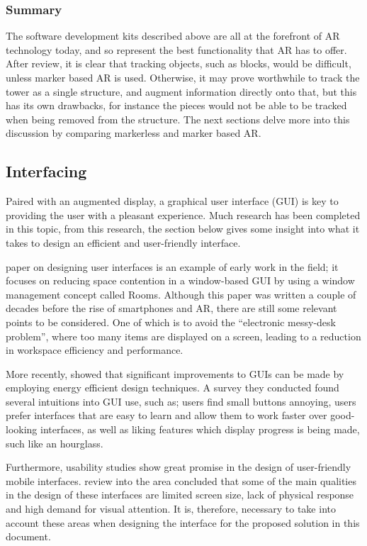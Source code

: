 \subsubsection{Summary}
The software development kits described above are all at the forefront of AR technology today, and so represent the best functionality that AR has to offer. After review, it is clear that tracking objects, such as \jenga{} blocks, would be difficult, unless marker based AR is used. Otherwise, it may prove worthwhile to track the tower as a single structure, and augment information directly onto that, but this has its own drawbacks, for instance the pieces would not be able to be tracked when being removed from the structure. The next sections delve more into this discussion by comparing markerless and marker based AR.

\subsection{Interfacing}

Paired with an augmented display, a graphical user interface (GUI) is key to providing the user with a pleasant experience. Much research has been completed in this topic, from this research, the section below gives some insight into what it takes to design an efficient and user-friendly interface.

 paper on designing user interfaces is an example of early work in the field; it focuses on reducing space contention in a window-based GUI by using a window management concept called Rooms. Although this paper was written a couple of decades before the rise of smartphones and AR, there are still some relevant points to be considered. One of which is to avoid the ``electronic messy-desk problem'', where too many items are displayed on a screen, leading to a reduction in workspace efficiency and performance.

More recently, \citet{guienergyefficiency} showed that significant improvements to GUIs can be made by employing energy efficient design techniques. A survey they conducted found several intuitions into GUI use, such as; users find small buttons annoying, users prefer interfaces that are easy to learn and allow them to work faster over good-looking interfaces, as well as liking features which display progress is being made, such like an hourglass.

Furthermore, usability studies show great promise in the design of user-friendly mobile interfaces.  review into the area concluded that some of the main qualities in the design of these interfaces are limited screen size, lack of physical response and high demand for visual attention. It is, therefore, necessary to take into account these areas when designing the interface for the proposed solution in this document.

